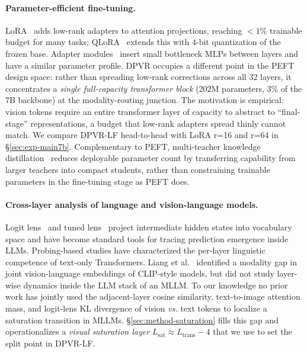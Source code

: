 \documentclass[a4paper,fleqn,review]{cas-sc}
\newcommand{\dpvr}{DPVR}
\newcommand{\dpvrlf}{DPVR-LF}
\begin{document}
\paragraph{Parameter-efficient fine-tuning.}
LoRA~\citep{hu2022lora} adds low-rank adapters to attention
projections, reaching $<\!1\%$ trainable budget for many tasks;
QLoRA~\citep{dettmers2023qlora} extends this with $4$-bit quantization
of the frozen base. Adapter modules~\citep{houlsby2019adapter} insert
small bottleneck MLPs between layers and have a similar parameter
profile. \dpvr{} occupies a different point in the PEFT design
space: rather than spreading low-rank corrections across all $32$
layers, it concentrates a \emph{single full-capacity transformer
block} ($202$M parameters, $3\%$ of the 7B backbone) at
the modality-routing junction. The motivation is empirical: vision
tokens require an entire transformer layer of capacity to abstract
to ``final-stage'' representations, a budget that low-rank adapters
spread thinly cannot match. We compare \dpvrlf{} head-to-head with
LoRA r=16 and r=64 in \S\ref{sec:exp-main7b}.
Complementary to PEFT, multi-teacher knowledge
distillation~\citep{jin2026exploring} reduces deployable parameter
count by transferring capability from larger teachers into compact
students, rather than constraining trainable parameters in the
fine-tuning stage as PEFT does.

\paragraph{Cross-layer analysis of language and vision-language models.}
Logit lens~\citep{nostalgebraist2020logitlens} and tuned
lens~\citep{belrose2023tunedlens} project intermediate hidden states
into vocabulary space and have become standard tools for tracing
prediction emergence inside LLMs. Probing-based studies have
characterized the per-layer linguistic competence of text-only
Transformers. Liang et al.~\citep{liang2022modalitygap} identified a
modality gap in joint vision-language embeddings of CLIP-style
models, but did not study layer-wise dynamics inside the LLM stack
of an MLLM. To our knowledge no prior work has jointly used the
adjacent-layer cosine similarity, text-to-image attention mass, and
logit-lens KL divergence of vision \emph{vs.} text tokens to localize
a saturation transition in MLLMs.
\S\ref{sec:method-saturation} fills this gap and operationalizes a
\emph{visual saturation layer}
$L_{\text{sat}} \approx L_{\text{trans}} - 4$ that we use to set the
split point in \dpvrlf{}.
\end{document}
